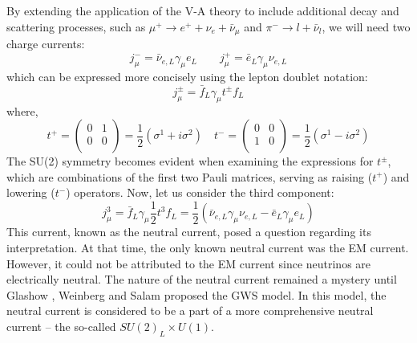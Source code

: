 By extending the application of the V-A theory to include additional decay 
and scattering processes, such as
$\mu^+ \rightarrow e^+ + \nu_e + \bar{\nu}_\mu$ and $\pi^- \rightarrow l + \bar{\nu}_l$,
we will need two charge currents:
\begin{equation}
    j_\mu^- = \bar{\nu}_{e, L} \gamma_\mu e_L	\qquad 
    j_\mu^+ = \bar{e}_L \gamma_\mu \nu_{e,L}
\end{equation}
which can be expressed more concisely using the lepton doublet notation:
\begin{equation}
    j_\mu^\pm = \bar{f}_L \gamma_\mu t^\pm f_L
\end{equation}
where,
\begin{equation}
    t^+  =
    \begin{pmatrix}
	0   & 1	\\
	0   & 0	\\
    \end{pmatrix}
    = \frac{1}{2}(\sigma^1 + i\sigma^2)
    \quad
    t^-  =
    \begin{pmatrix}
	0   & 0	\\
	1   & 0	\\
    \end{pmatrix}
    = \frac{1}{2}(\sigma^1 - i\sigma^2)
\end{equation}
The SU(2) symmetry becomes evident when examining the expressions for $t^\pm$, 
which are combinations of the first two Pauli matrices, serving as  
raising ($t^+$) and lowering ($t^-$) operators. 
Now, let us consider the third component:
\begin{equation}
    j_\mu^3 = \bar{f}_L \gamma_\mu \frac{1}{2}t^3 f_L = \frac{1}{2} (\bar{\nu}_{e, L} \gamma_\mu \nu_{e, L} - \bar{e}_{L} \gamma_\mu e_L)
\end{equation}
This current, known as the neutral current, posed a question regarding its
interpretation. At that time, the only known neutral current was the EM current. 
However, it could not be attributed to the EM current since neutrinos are 
electrically neutral. The nature of the neutral current remained a mystery
until Glashow \cite{GLASHOW1961579}, Weinberg \cite{PhysRevLett.19.1264} and 
Salam \cite{Salam:1968rm} proposed the GWS model. In this model, the neutral
current is considered to be a part of a more comprehensive neutral current 
-- the so-called $SU(2)_L \times U(1)$.

